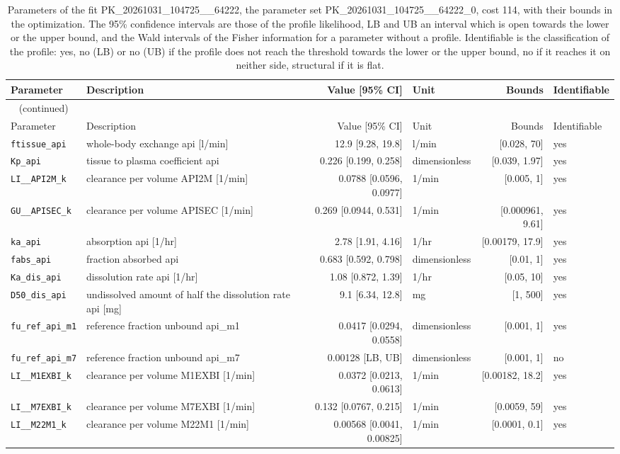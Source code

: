 \begin{longtable}{llrlrl}
\caption{Parameters of the fit PK\_20261031\_104725\_\_64222, the parameter set PK\_20261031\_104725\_\_64222\_0, cost 114, with their bounds in the optimization. The 95\% confidence intervals are those of the profile likelihood, LB and UB an interval which is open towards the lower or the upper bound, and the Wald intervals of the Fisher information for a parameter without a profile. Identifiable is the classification of the profile: yes, no (LB) or no (UB) if the profile does not reach the threshold towards the lower or the upper bound, no if it reaches it on neither side, structural if it is flat.}\label{tab:parameters:PK_20261031_104725__64222} \\
\toprule
Parameter & Description & Value [95\% CI] & Unit & Bounds & Identifiable \\
\midrule
\endfirsthead
\multicolumn{6}{l}{\small\tablename~\thetable{} (continued)} \\
\toprule
Parameter & Description & Value [95\% CI] & Unit & Bounds & Identifiable \\
\midrule
\endhead
\bottomrule
\endlastfoot
\texttt{ftissue\_api} & whole-body exchange api [l/min] & 12.9 [9.28, 19.8] & l/min & [0.028, 70] & yes \\
\texttt{Kp\_api} & tissue to plasma coefficient api & 0.226 [0.199, 0.258] & dimensionless & [0.039, 1.97] & yes \\
\texttt{LI\_\_API2M\_k} & clearance per volume API2M [1/min] & 0.0788 [0.0596, 0.0977] & 1/min & [0.005, 1] & yes \\
\texttt{GU\_\_APISEC\_k} & clearance per volume APISEC [1/min] & 0.269 [0.0944, 0.531] & 1/min & [0.000961, 9.61] & yes \\
\texttt{ka\_api} & absorption api [1/hr] & 2.78 [1.91, 4.16] & 1/hr & [0.00179, 17.9] & yes \\
\texttt{fabs\_api} & fraction absorbed api & 0.683 [0.592, 0.798] & dimensionless & [0.01, 1] & yes \\
\texttt{Ka\_dis\_api} & dissolution rate api [1/hr] & 1.08 [0.872, 1.39] & 1/hr & [0.05, 10] & yes \\
\texttt{D50\_dis\_api} & undissolved amount of half the dissolution rate api [mg] & 9.1 [6.34, 12.8] & mg & [1, 500] & yes \\
\texttt{fu\_ref\_api\_m1} & reference fraction unbound api\_m1 & 0.0417 [0.0294, 0.0558] & dimensionless & [0.001, 1] & yes \\
\texttt{fu\_ref\_api\_m7} & reference fraction unbound api\_m7 & 0.00128 [LB, UB] & dimensionless & [0.001, 1] & no \\
\texttt{LI\_\_M1EXBI\_k} & clearance per volume M1EXBI [1/min] & 0.0372 [0.0213, 0.0613] & 1/min & [0.00182, 18.2] & yes \\
\texttt{LI\_\_M7EXBI\_k} & clearance per volume M7EXBI [1/min] & 0.132 [0.0767, 0.215] & 1/min & [0.0059, 59] & yes \\
\texttt{LI\_\_M22M1\_k} & clearance per volume M22M1 [1/min] & 0.00568 [0.0041, 0.00825] & 1/min & [0.0001, 0.1] & yes \\
\end{longtable}

